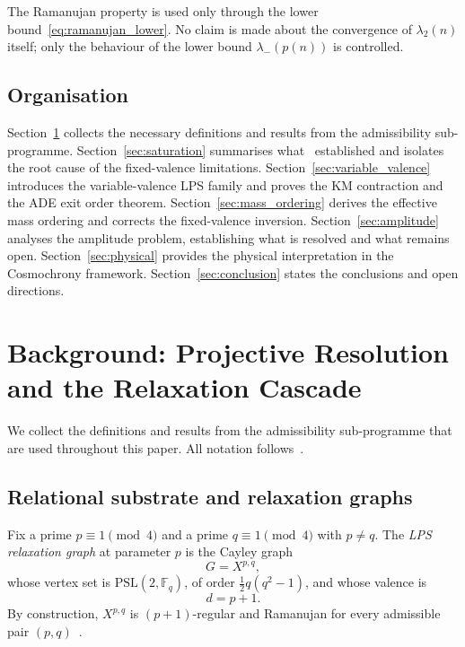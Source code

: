 \documentclass[11pt]{article}
\begin{document}
      The Ramanujan property is used only through the lower
      bound~\eqref{eq:ramanujan_lower}.
      No claim is made about the convergence of $\lambda_2(n)$ itself; only the
      behaviour of the lower bound $\lambda_-(p(n))$ is controlled.

    \subsection{Organisation}
      \label{subsec:organisation}

      Section~\ref{sec:background} collects the necessary definitions and results
      from the admissibility sub-programme.
      Section~\ref{sec:saturation} summarises what~\cite{Beau2026a5} established and
      isolates the root cause of the fixed-valence limitations.
      Section~\ref{sec:variable_valence} introduces the variable-valence LPS family
      and proves the KM contraction and the ADE exit order theorem.
      Section~\ref{sec:mass_ordering} derives the effective mass ordering and
      corrects the fixed-valence inversion.
      Section~\ref{sec:amplitude} analyses the amplitude problem, establishing what
      is resolved and what remains open.
      Section~\ref{sec:physical} provides the physical interpretation in the Cosmochrony
      framework.
      Section~\ref{sec:conclusion} states the conclusions and open directions.

  \section{Background: Projective Resolution and the Relaxation Cascade}
    \label{sec:background}


    We collect the definitions and results from the admissibility sub-programme
    that are used throughout this paper.
    All notation follows~\cite{Beau2026a5}.

    \subsection{Relational substrate and relaxation graphs}
      \label{subsec:graphs}

      Fix a prime $p \equiv 1 \pmod{4}$ and a prime $q \equiv 1 \pmod{4}$ with
      $p \neq q$.
      The \emph{LPS relaxation graph} at parameter $p$ is the Cayley graph
      \begin{equation}
        G = X^{p,q},
      \end{equation}
      whose vertex set is $\mathrm{PSL}(2,\mathbb{F}_q)$, of order
      $\tfrac{1}{2}q(q^2-1)$, and whose valence is
      \begin{equation}
        d = p + 1.
      \end{equation}
      By construction, $X^{p,q}$ is $(p+1)$-regular and Ramanujan for every
      admissible pair $(p,q)$~\cite{LPS}.
\end{document}
